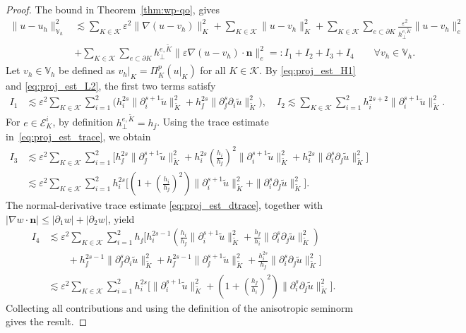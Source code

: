 \documentclass[a4paper,twoside,10pt]{article}
\newcommand{\eps}{\varepsilon}
\newcommand{\calE}{\mathcal{E}}
\newcommand{\calK}{\mathcal{K}}
\newcommand{\bn}{\mathbf{n}}
\numberwithin{equation}{section}
\newcommand{\Vh}{\mathbb{V}_{\! h}}
\newcommand{\vh}{v_h}
\newcommand{\Kt}{\widetilde{K}}
\begin{document}
	\begin{proof}
		The bound in Theorem~\ref{thm:wp-qo}, gives
		\begin{align*}
			\|u-u_h\|_{\Vh}^2&	\lesssim\sum_{K\in\calK}\eps^2\|\nabla (u-v_h) \|_{K}^2+\sum_{K\in\calK}\|u-v_h\|_{K}^2
			+\sum_{K\in\calK}\sum_{e\subset\partial K}
			\frac{\eps^2}{h_\perp^{e,\Kt}}\|u-v_h\|_{e}^2\\&
		   +\sum_{K\in\calK}\sum_{e\subset\partial K}
			h_\perp^{e,\Kt}\|\eps\nabla (u-v_h) \cdot\bn\|_{e}^2
            =:  I_1+I_2+I_3+I_4 \qquad \forall v_h\in \Vh.
		\end{align*}	
		Let $\vh\in \Vh$ be defined as $v_h|_K  = \Pi^p_K (u|_K)$ for all $K\in \calK$.
		By \eqref{eq:proj_est_H1} and \eqref{eq:proj_est_L2}, the first two terms satisfy
		\begin{align*}
			I_1
			&\lesssim
			\eps^2\sum_{K\in\calK}\sum_{i=1}^2
			\Big(
			h_i^{2s}\|\partial_i^{s+1}\widetilde u\|_{\Kt}^2
			+h_{\jj}^{2s}\|\partial_{\jj}^s\partial_i\widetilde u\|_{\Kt}^2
			\Big),
			\quad
			I_2
			\lesssim
			\sum_{K\in\calK}\sum_{i=1}^2
			h_i^{2s+2}\|\partial_i^{s+1}\widetilde u\|_{\Kt}^2.
		\end{align*}
	For $e\in\calE^i_K$, by definition
	$h_\perp^{e,\Kt}=h_{\jj}$.
	Using the trace estimate 
    in~\eqref{eq:proj_est_trace}, we obtain
    \begin{align*}
    I_3 &\lesssim \eps^2 \sum_{K\in\calK}\sum_{i=1}^2 \Bigg[ h_{\jj}^{2s} \|\partial_{\jj}^{s+1}\widetilde u\|_{\Kt}^2 + h_i^{2s} \left(\frac{h_i}{h_{\jj}}\right)^2 \|\partial_i^{s+1}\widetilde u\|_{\Kt}^2 + h_i^{2s} \|\partial_i^s\partial_{\jj}\widetilde u\|_{\Kt}^2 \Bigg]
    \\
    &\lesssim \eps^2 \sum_{K\in\calK}\sum_{i=1}^2 h_i^{2s} \Bigg[ \left( 1+\left(\frac{h_i}{h_{\jj}}\right)^2 \right) \|\partial_i^{s+1}\widetilde u\|_{\Kt}^2 + \|\partial_i^s\partial_{\jj}\widetilde u\|_{\Kt}^2
    \Bigg].
    \end{align*}
    The normal-derivative trace estimate \eqref{eq:proj_est_dtrace}, together with
    $|\nabla w\cdot\bn|\le |\partial_1 w|+|\partial_2 w|$, yield
    \begin{align*}
    I_4 &\lesssim \eps^2 \sum_{K\in\calK}\sum_{i=1}^2 h_{\jj} \Bigg[ h_i^{2s-1} \left( \frac{h_i}{h_{\jj}} \|\partial_i^{s+1}\widetilde u\|_{\Kt}^2 + \frac{h_{\jj}}{h_i} \|\partial_i^s\partial_{\jj}\widetilde u\|_{\Kt}^2 \right)
    \\
    &\qquad + h_{\jj}^{2s-1} \|\partial_{\jj}^{s}\partial_i\widetilde u\|_{\Kt}^2 + h_{\jj}^{2s-1} \|\partial_{\jj}^{s+1}\widetilde u\|_{\Kt}^2 + \frac{h_i^{2s}}{h_{\jj}} \|\partial_i^s\partial_{\jj}\widetilde u\|_{\Kt}^2 \Bigg]
    \\
    &\lesssim \eps^2 \sum_{K\in\calK}\sum_{i=1}^2 h_i^{2s} \Bigg[ \|\partial_i^{s+1}\widetilde u\|_{\Kt}^2 + \left( 1+\left(\frac{h_{\jj}}{h_i}\right)^2 \right) \|\partial_i^s\partial_{\jj}\widetilde u\|_{\Kt}^2 \Bigg].
    \end{align*}
Collecting all contributions and using the definition of the anisotropic seminorm gives the result.
\end{proof}
\end{document}
